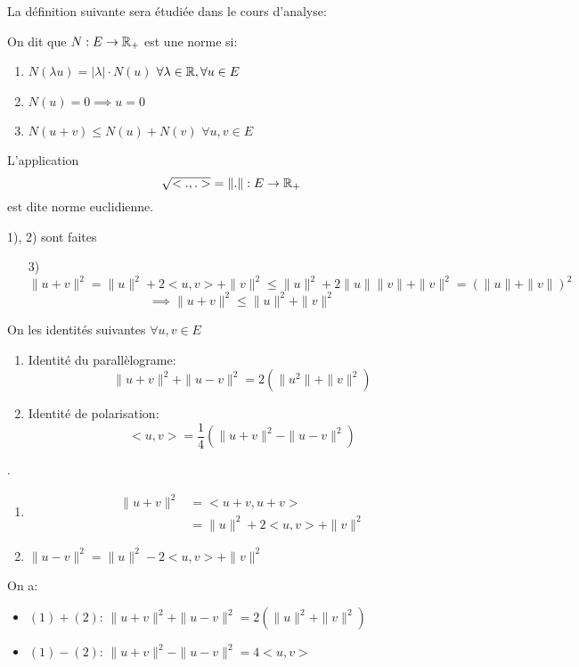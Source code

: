 \documentclass[a4paper]{report}
\begin{document}
La définition suivante sera étudiée dans le cours d'analyse:
\begin{definition}
    On dit que $N: E \to \mathbb{R}_+$ est une norme si:
    \begin{enumerate}
        \item $N(\lambda u) = |\lambda| \cdot N(u)$ \quad  $\forall \lambda \in \mathbb{R}, \forall u \in E$
        \item $N(u) = 0 \implies u = 0$
        \item $N(u + v) \le N(u) + N(v)$ \quad $\forall u, v \in E$
    \end{enumerate}
\end{definition}
\begin{lemma}
   L'application
   \[
   \sqrt{<.,.>} = \| . \|: E \to \mathbb{R}_+ 
   \] 
   est dite norme euclidienne.
\end{lemma}
\begin{explanation}
    1), 2) sont faites\\
    \begin{itemize}
        \item[3)] $\| u + v \|^2 = \|u\|^2 + 2<u,v> + \|v\|^2 \le \|u\|^2 + 2\|u\|\|v\| + \|v\|^2 = (\|u\| + \|v\|)^2$
            \[
            \implies \|u + v\|^2 \le \|u\|^2 + \|v\|^2
            \] 
    \end{itemize}
\end{explanation}
\begin{prop}
   On les identités suivantes $\forall u, v \in E$ 
   \begin{enumerate}
       \item Identité du parallèlograme:
           \[
           \|u + v\|^2 + \|u - v\|^2 = 2(\|u^2\| + \|v\|^2)
           \] 
       \item Identité de polarisation:
           \[
           <u, v> = \frac{1}{4}(\|u + v\|^2 - \|u - v\|^2)
           \] 
   \end{enumerate}
\end{prop}
\begin{explanation}.
   \begin{enumerate}
       \item 
           \begin{align*}
               \|u + v\|^2 &= <u + v, u + v>\\
                           &= \|u\|^2 + 2<u,v> + \|v\|^2
           \end{align*}
        \item $\|u - v\|^2 = \|u\|^2 - 2<u, v> + \|v\|^2$
   \end{enumerate} 
   On a:
   \begin{itemize}
       \item 
           $(1) + (2)$:  $\|u + v\|^2 + \|u - v\|^2 = 2 (\|u\|^2 + \|v\|^2)$
       \item $(1) - (2)$:  $\|u + v\|^2 - \|u - v\|^2 = 4<u, v>$ 
   \end{itemize}
\end{explanation}
\end{document}
